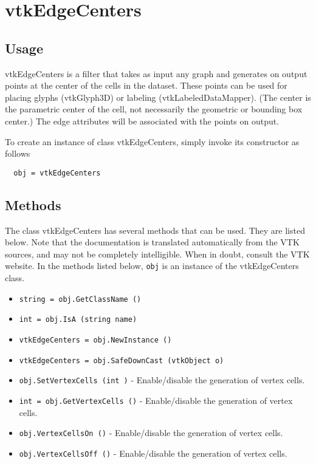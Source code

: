 \section{vtkEdgeCenters}

\subsection{Usage}

 vtkEdgeCenters is a filter that takes as input any graph and 
 generates on output points at the center of the cells in the dataset.
 These points can be used for placing glyphs (vtkGlyph3D) or labeling 
 (vtkLabeledDataMapper). (The center is the parametric center of the
 cell, not necessarily the geometric or bounding box center.) The edge
 attributes will be associated with the points on output.
 

To create an instance of class vtkEdgeCenters, simply
invoke its constructor as follows
\begin{verbatim}
  obj = vtkEdgeCenters
\end{verbatim}
\subsection{Methods}

The class vtkEdgeCenters has several methods that can be used.
  They are listed below.
Note that the documentation is translated automatically from the VTK sources,
and may not be completely intelligible.  When in doubt, consult the VTK website.
In the methods listed below, \verb|obj| is an instance of the vtkEdgeCenters class.
\begin{itemize}
\item  \verb|string = obj.GetClassName ()|

\item  \verb|int = obj.IsA (string name)|

\item  \verb|vtkEdgeCenters = obj.NewInstance ()|

\item  \verb|vtkEdgeCenters = obj.SafeDownCast (vtkObject o)|

\item  \verb|obj.SetVertexCells (int )| -  Enable/disable the generation of vertex cells.

\item  \verb|int = obj.GetVertexCells ()| -  Enable/disable the generation of vertex cells.

\item  \verb|obj.VertexCellsOn ()| -  Enable/disable the generation of vertex cells.

\item  \verb|obj.VertexCellsOff ()| -  Enable/disable the generation of vertex cells.

\end{itemize}

